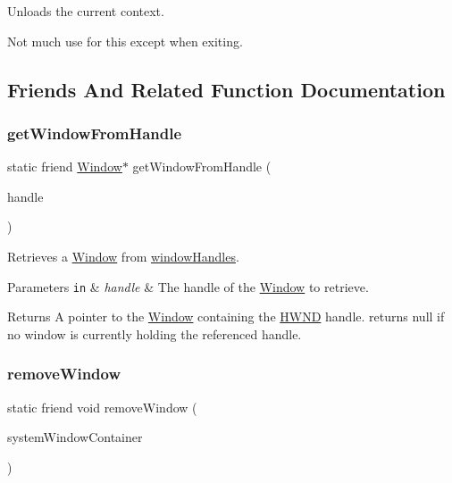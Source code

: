 Unloads the current context.

Not much use for this except when exiting. 

\subsection{Friends And Related Function Documentation}
\mbox{\label{class_window_aca83cc9021e3e6075031093398621437}} 
\subsubsection{\texorpdfstring{get\+Window\+From\+Handle}{getWindowFromHandle}}
{\footnotesize\ttfamily static friend \mbox{\hyperlink{class_window}{Window}}$\ast$ get\+Window\+From\+Handle (\begin{DoxyParamCaption}\item[{H\+W\+ND}]{handle }\end{DoxyParamCaption})\hspace{0.3cm}{\ttfamily [friend]}}

Retrieves a \mbox{\hyperlink{class_window}{Window}} from \mbox{\hyperlink{_win32_window_8cpp_a0694e9af65d10d69624aa9a76b32cecd}{window\+Handles}}.


\begin{DoxyParams}[1]{Parameters}
\mbox{\tt in}  & {\em handle} & The handle of the \mbox{\hyperlink{class_window}{Window}} to retrieve. \\
\hline
\end{DoxyParams}
\begin{DoxyReturn}{Returns}
A pointer to the \mbox{\hyperlink{class_window}{Window}} containing the \mbox{\hyperlink{}{H\+W\+ND}} {\ttfamily handle}. returns null if no window is currently holding the referenced handle. 
\end{DoxyReturn}
\mbox{\label{class_window_a893ed9ae2158e583c7bac06deddc8bb3}} 
\subsubsection{\texorpdfstring{remove\+Window}{removeWindow}}
{\footnotesize\ttfamily static friend void remove\+Window (\begin{DoxyParamCaption}\item[{\mbox{\hyperlink{class_window}{Window}} $\ast$}]{system\+Window\+Container }\end{DoxyParamCaption})\hspace{0.3cm}{\ttfamily [friend]}}


